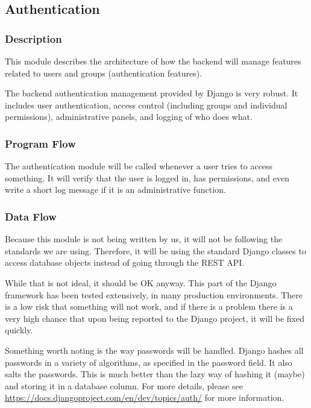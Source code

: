 
\subsection{Authentication}

\subsubsection{Description}

This module describes the architecture of how the backend will manage features related to users and groups (authentication features).

The backend authentication management provided by Django is very robust. It includes user authentication, access control (including groups and individual permissions), administrative panels, and logging of who does what. 

\subsubsection{Program Flow}

The authentication module will be called whenever a user tries to access something. It will verify that the user is logged in, has permissions, and even write a short log message if it is an administrative function.

\subsubsection{Data Flow}

Because this module is not being written by us, it will not be following the standards we are using. Therefore, it will be using the standard Django classes to access database objects instead of going through the REST API. 

While that is not ideal, it should be OK anyway. This part of the Django framework has been tested extensively, in many production environments. There is a low risk that something will not work, and if there is a problem there is a very high chance that upon being reported to the Django project, it will be fixed quickly.

Something worth noting is the way passwords will be handled. Django hashes all passwords in a variety of algorithms, as specified in the password field. It also salts the passwords. This is much better than the lazy way of hashing it (maybe) and storing it in a database column. For more details, please see \url{https://docs.djangoproject.com/en/dev/topics/auth/} for more information.

